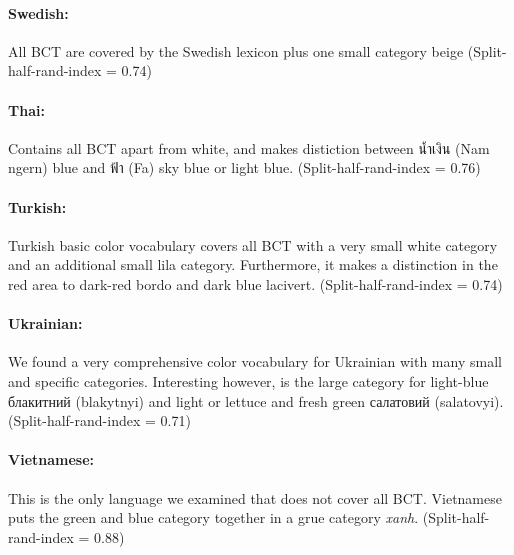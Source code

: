\paragraph{Swedish:}
All BCT are covered by the Swedish lexicon plus one small category beige
(Split-half-rand-index = 0.74)

\paragraph{Thai:}
Contains all BCT apart from white, and makes distiction between \textthai{น้ำเงิน} (Nam ngern) blue and \textthai{ฟ้า} (Fa) sky blue or light blue.
(Split-half-rand-index = 0.76)

\paragraph{Turkish:}
Turkish basic color vocabulary covers all BCT with a very small white category and an additional small lila category.
Furthermore, it makes a distinction in the red area to dark-red bordo and dark blue lacivert.
(Split-half-rand-index = 0.74)

\paragraph{Ukrainian:}
We found a very comprehensive color vocabulary for Ukrainian with many small and specific categories.
Interesting however, is the large category for light-blue \textukrainian{блакитний} (blakytnyi) and light or lettuce and fresh green \textukrainian{салатовий} (salatovyi).
(Split-half-rand-index = 0.71)

\paragraph{Vietnamese:}
This is the only language we examined that does not cover all BCT. Vietnamese puts the green and blue category together in a grue category \textit{xanh}.
(Split-half-rand-index = 0.88)





